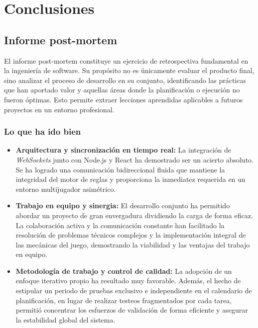 \chapter{Conclusiones}

\begin{abstract}
Este capítulo presenta una evaluación final del Trabajo Fin de Grado y del proceso de desarrollo de \textit{King and Peasant}. El objetivo es realizar una reflexión crítica sobre los resultados obtenidos, analizando tanto los aciertos técnicos y organizativos como las dificultades encontradas a lo largo del ciclo de vida del proyecto. Finalmente, se expondrán las posibles líneas de investigación y desarrollo que podrían dar continuidad a este trabajo en el futuro.
\end{abstract}

\section{Informe post-mortem}

El informe post-mortem constituye un ejercicio de retrospectiva fundamental en la ingeniería de software. Su propósito no es únicamente evaluar el producto final, sino analizar el proceso de desarrollo en su conjunto, identificando las prácticas que han aportado valor y aquellas áreas donde la planificación o ejecución no fueron óptimas. Esto permite extraer lecciones aprendidas aplicables a futuros proyectos en un entorno profesional.

\subsection{Lo que ha ido bien}

\begin{itemize}
\item \textbf{Arquitectura y sincronización en tiempo real:} La integración de \textit{WebSockets} junto con Node.js y React ha demostrado ser un acierto absoluto. Se ha logrado una comunicación bidireccional fluida que mantiene la integridad del motor de reglas y proporciona la inmediatez requerida en un entorno multijugador asimétrico.

\item \textbf{Trabajo en equipo y sinergia:} El desarrollo conjunto ha permitido abordar un proyecto de gran envergadura dividiendo la carga de forma eficaz. La colaboración activa y la comunicación constante han facilitado la resolución de problemas técnicos complejos y la implementación integral de las mecánicas del juego, demostrando la viabilidad y las ventajas del trabajo en equipo.

\item \textbf{Metodología de trabajo y control de calidad:} La adopción de un enfoque iterativo propio ha resultado muy favorable. Además, el hecho de estipular un periodo de pruebas exclusivo e independiente en el calendario de planificación, en lugar de realizar testeos fragmentados por cada tarea, permitió concentrar los esfuerzos de validación de forma eficiente y asegurar la estabilidad global del sistema.
\end{itemize}

